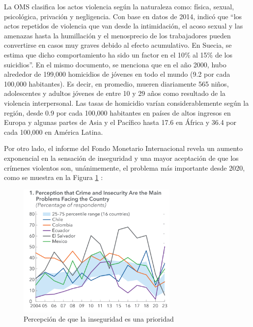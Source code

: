 La OMS clasifica los actos violencia según la naturaleza como: 
física, sexual, psicológica, privación y negligencia. 
Con base en datos de 2014, indicó que ``los actos 
repetidos de violencia que van desde la intimidación, el acoso 
sexual y las amenazas hasta la humillación y el menosprecio de 
los trabajadores pueden convertirse en casos muy graves debido 
al efecto acumulativo. En Suecia, se estima que dicho 
comportamiento ha sido un factor en el 10\% al 15\% de los 
suicidios''. En el mismo documento, se menciona que en el año 
2000, hubo alrededor de 199,000 homicidios de jóvenes en todo 
el mundo (9.2 por cada 100,000 habitantes). Es decir, en 
promedio, mueren diariamente 565 niños, adolescentes y adultos 
jóvenes de entre 10 y 29 años como resultado de la violencia 
interpersonal. Las tasas de homicidio varían considerablemente 
según la región, desde 0.9 por cada 100,000 habitantes en 
países de altos ingresos en Europa y algunas partes de Asia y 
el Pacífico hasta 17.6 en África y 36.4 por cada 100,000 en 
América Latina.

Por otro lado, el informe del Fondo Monetario Internacional 
revela un aumento exponencial en la sensación de inseguridad y 
una mayor aceptación de que los crímenes violentos son, 
unánimemente, el problema más importante desde 2020, como 
se muestra en la Figura \ref{fig:percepcion} \cite{Bisca2024}:

\begin{figure}[h!] %
    \centering
    \includegraphics[width=0.7\textwidth]{images/inseguridad2024.png} %
    \caption{Percepción de que la inseguridad es una prioridad \protect\cite{Bisca2024}}
    \label{fig:percepcion}
\end{figure}

